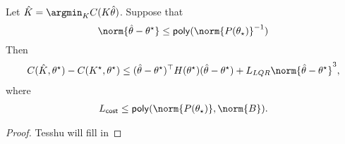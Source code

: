 \begin{theorem}
    \label{thm: CE bound}
    Let $\hat K = \argmin_K C(K \hat \theta)$. Suppose that 
    \[
        \norm{\hat \theta - \theta^\star} \leq \mathsf{poly}(\norm{P(\theta_\star)}^{-1})
    \]
    Then
    \begin{align*}
        C(\hat K, \theta^\star) - C(K^\star, \theta^\star) \leq (\hat\theta - \theta^\star)^\top H(\theta^\star) (\hat \theta - \theta^\star) + L_{LQR} \norm{\hat \theta - \theta^\star}^3, 
    \end{align*}
    where 
    \begin{align*}
        L_{\mathsf{cost}} \leq \mathsf{poly}(\norm{P(\theta_\star)}, \norm{B}).
    \end{align*}
\end{theorem}
\begin{proof}
    {\color{red} Tesshu will fill in}
\end{proof}

